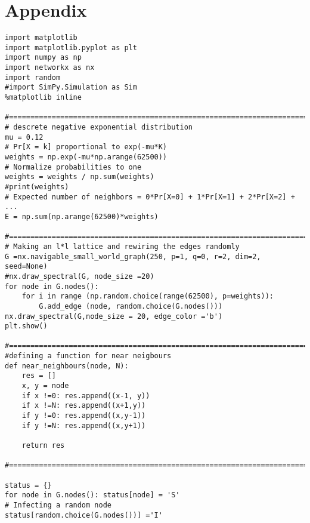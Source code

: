 \chapter{Appendix}

\begin{verbatim}
import matplotlib
import matplotlib.pyplot as plt
import numpy as np
import networkx as nx
import random
#import SimPy.Simulation as Sim
%matplotlib inline

#==========================================================================
# descrete negative exponential distribution
mu = 0.12
# Pr[X = k] proportional to exp(-mu*K)
weights = np.exp(-mu*np.arange(62500))
# Normalize probabilities to one
weights = weights / np.sum(weights)
#print(weights)
# Expected number of neighbors = 0*Pr[X=0] + 1*Pr[X=1] + 2*Pr[X=2] + ...
E = np.sum(np.arange(62500)*weights)

#========================================================================
# Making an l*l lattice and rewiring the edges randomly 
G =nx.navigable_small_world_graph(250, p=1, q=0, r=2, dim=2, seed=None)
#nx.draw_spectral(G, node_size =20)
for node in G.nodes():
    for i in range (np.random.choice(range(62500), p=weights)):
        G.add_edge (node, random.choice(G.nodes()))
nx.draw_spectral(G,node_size = 20, edge_color ='b')
plt.show()

#===========================================================================
#defining a function for near neigbours 
def near_neighbours(node, N):
    res = []
    x, y = node
    if x !=0: res.append((x-1, y))
    if x !=N: res.append((x+1,y))
    if y !=0: res.append((x,y-1))
    if y !=N: res.append((x,y+1))
    
    return res
    
#============================================================================= 

status = {}
for node in G.nodes(): status[node] = 'S'
# Infecting a random node
status[random.choice(G.nodes())] ='I'



\end{verbatim}

